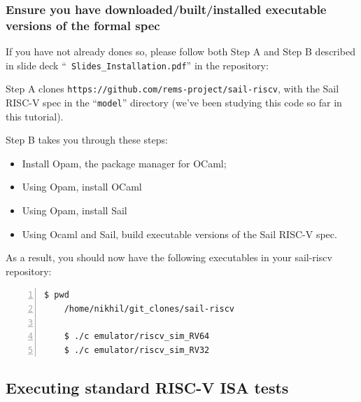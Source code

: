 \documentclass[aspectratio=169]{beamer}
\newcommand{\hmm}{\hspace*{2em}}
\newcommand{\slidefont}{\scriptsize}
\begin{document}

\begin{frame}[fragile]
  \frametitle{Ensure you have downloaded/built/installed executable versions of the formal spec}

  \slidefont

  If you have not already dones so, please follow both Step A and Step B described in slide deck ``{\tt
    Slides\_Installation.pdf}'' in the repository:

  \vspace{1ex}

  \hmm {\tt https://github.com/rsnikhil/RISCV\_ISA\_Spec\_Tour}

  \vspace{1ex}

  Step A clones {\tt https://github.com/rems-project/sail-riscv}, with
  the Sail RISC-V spec in the ``{\tt model}'' directory (we've been
  studying this code so far in this tutorial).

  \vspace{1ex}

  Step B takes you through these steps:
  \begin{itemize}
  \item Install Opam, the package manager for OCaml;
  \item Using Opam, install OCaml
  \item Using Opam, install Sail
  \item Using Ocaml and Sail, build executable versions of the Sail RISC-V spec.
  \end{itemize}

  As a result, you should now have the following executables in your sail-riscv repository:

  \vspace{1ex}

  \begin{Verbatim}[frame=single, numbers=left, label = in your sail-riscv repository clone]
    $ pwd
    /home/nikhil/git_clones/sail-riscv

    $ ./c emulator/riscv_sim_RV64
    $ ./c emulator/riscv_sim_RV32
  \end{Verbatim}

\end{frame}


\subsection{Executing standard RISC-V ISA tests}
\end{document}
